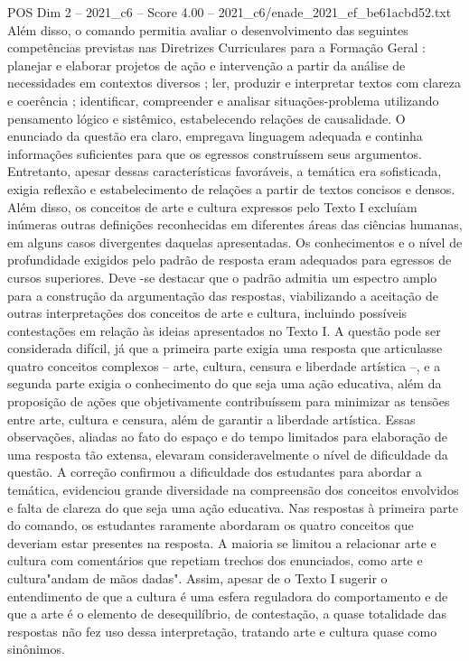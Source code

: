\begin{textsample}{POS Dim 2 – 2021\_c6 – Score 4.00 – 2021\_c6/enade\_2021\_ef\_be61acbd52.txt}
Além disso, o comando permitia avaliar o desenvolvimento das seguintes competências previstas nas Diretrizes Curriculares para a Formação Geral : planejar e elaborar projetos de ação e intervenção a partir da análise de necessidades em contextos diversos ; ler, produzir e interpretar textos com clareza e coerência ; identificar, compreender e analisar situações-problema utilizando pensamento lógico e sistêmico, estabelecendo relações de causalidade.
O enunciado da questão era claro, empregava linguagem adequada e continha informações suficientes para que os egressos construíssem seus argumentos.
Entretanto, apesar dessas características favoráveis, a temática era sofisticada, exigia reflexão e estabelecimento de relações a partir de textos concisos e densos.
Além disso, os conceitos de arte e cultura expressos pelo Texto I excluíam inúmeras outras definições reconhecidas em diferentes áreas das ciências humanas, em alguns casos divergentes daquelas apresentadas.
Os conhecimentos e o nível de profundidade exigidos pelo padrão de resposta eram adequados para egressos de cursos superiores.
Deve -se destacar que o padrão admitia um espectro amplo para a construção da argumentação das respostas, viabilizando a aceitação de outras interpretações dos conceitos de arte e cultura, incluindo possíveis contestações em relação às ideias apresentados no Texto I.
A questão pode ser considerada difícil, já que a primeira parte exigia uma resposta que articulasse quatro conceitos complexos – arte, cultura, censura e liberdade artística –, e a segunda parte exigia o conhecimento do que seja uma ação educativa, além da proposição de ações que objetivamente contribuíssem para minimizar as tensões entre arte, cultura e censura, além de garantir a liberdade artística.
Essas observações, aliadas ao fato do espaço e do tempo limitados para elaboração de uma resposta tão extensa, elevaram consideravelmente o nível de dificuldade da questão.
A correção confirmou a dificuldade dos estudantes para abordar a temática, evidenciou grande diversidade na compreensão dos conceitos envolvidos e falta de clareza do que seja uma ação educativa.
Nas respostas à primeira parte do comando, os estudantes raramente abordaram os quatro conceitos que deveriam estar presentes na resposta.
A maioria se limitou a relacionar arte e cultura com comentários que repetiam trechos dos enunciados, como arte e cultura"andam de mãos dadas".
Assim, apesar de o Texto I sugerir o entendimento de que a cultura é uma esfera reguladora do comportamento e de que a arte é o elemento de desequilíbrio, de contestação, a quase totalidade das respostas não fez uso dessa interpretação, tratando arte e cultura quase como sinônimos.

\end{textsample}
